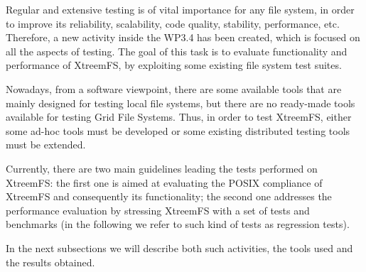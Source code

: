 Regular and extensive testing is of vital importance for any file
system, in order to improve its reliability, scalability, code
quality, stability, performance, etc. Therefore, a new activity
inside the WP3.4 has been created, which is focused on all the
aspects of testing. The goal of this task is to evaluate
functionality and performance of XtreemFS, by exploiting some
existing file system test suites.

Nowadays, from a software viewpoint, there are some available tools
that are mainly designed for testing local file systems, but there
are no ready-made tools available for testing Grid File Systems.
Thus, in order to test XtreemFS, either some ad-hoc tools must be
developed or some existing distributed testing tools must be
extended.

Currently, there are two main guidelines leading the tests performed
on XtreemFS: the first one is aimed at evaluating the POSIX
compliance of XtreemFS and consequently its functionality; the
second one addresses the performance evaluation by stressing
XtreemFS with a set of tests and benchmarks (in the following we
refer to such kind of tests as regression tests).

In the next subsections we will describe both such activities, the
tools used and the results obtained.

